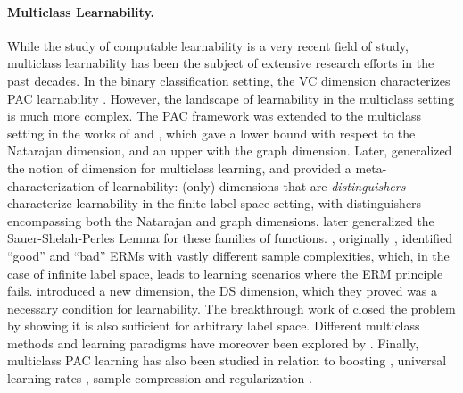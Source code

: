 \paragraph{Multiclass Learnability.}
While the study of computable learnability is a very recent field of study, multiclass learnability has been the subject of extensive research efforts in the past decades.
In the binary classification setting, the VC dimension characterizes PAC learnability \citep{vapnik1971uniform,ehrenfeucht1989general,blumer1989learnability}.
However, the landscape of learnability in the multiclass setting is much more complex.
The PAC framework was extended to the multiclass setting in the works of \cite{natarajan1988two} and \cite{natarajan1989learning}, which gave a lower bound with respect to the Natarajan dimension, and an upper with the graph dimension.
Later, \cite{ben1992characterizations} generalized the notion of dimension for multiclass learning, and provided a meta-characterization of learnability: (only) dimensions that are \emph{distinguishers} characterize learnability in the finite label space setting, with distinguishers encompassing both the Natarajan and graph dimensions.
\cite{haussler1995generalization} later generalized the Sauer-Shelah-Perles Lemma for these families of functions.
\cite{daniely2015multiclass}, originally \citep{daniely2011multiclass}, identified ``good'' and ``bad'' ERMs with vastly different sample complexities, which, in the case of infinite label space, leads to learning scenarios where the ERM principle fails.
\cite{daniely2014optimal} introduced a new dimension, the DS dimension, which they proved was a necessary condition for learnability. 
The breakthrough work of \cite{brukhim2022characterization} closed the problem by showing it is also sufficient for arbitrary label space.
Different multiclass methods and learning paradigms have moreover been explored by \cite{daniely2012multiclass,rubinstein2006shifting,daniely2015inapproximability}.
Finally, multiclass PAC learning has also been studied in relation to boosting \citep{brukhim2021multiclass,brukhim2023improper,brukhim2024multiclass}, universal learning rates \citep{kalavasis2022multiclass,hanneke2023universal}, sample compression  \citep{pabbaraju2024multiclass} and regularization \citep{asilis2024regularization}.